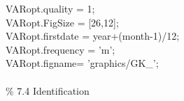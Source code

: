\hspace{1mm}\hspace{5mm} \hspace{5mm} \hspace{5mm} \hspace{5mm} \hspace{5mm} VARopt.quality = 1; \\ 
\hspace{1mm}\hspace{5mm} \hspace{5mm} \hspace{5mm} \hspace{5mm} \hspace{5mm} VARopt.FigSize = [26,12]; \\ 
\hspace{1mm}\hspace{5mm} \hspace{5mm} \hspace{5mm} \hspace{5mm} \hspace{5mm} VARopt.firstdate = year+(month-1)/12; \\ 
\hspace{1mm}\hspace{5mm} \hspace{5mm} \hspace{5mm} \hspace{5mm} \hspace{5mm} VARopt.frequency = \textcolor{matlabpurple}{'m'}; \\ 
\hspace{1mm}\hspace{5mm} \hspace{5mm} \hspace{5mm} \hspace{5mm} \hspace{5mm} VARopt.figname= \textcolor{matlabpurple}{'graphics/GK\_'}; \\ 
\hspace{1mm}\hspace{5mm} \hspace{5mm} \hspace{5mm} \hspace{5mm} \hspace{5mm}  \\ 
\hspace{1mm}\hspace{5mm} \hspace{5mm} \hspace{5mm} \hspace{5mm} \hspace{5mm} \textcolor{matlabgreen}{\% 7.4 Identification }\\ 

